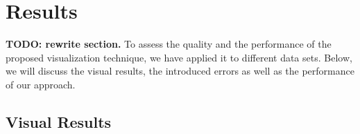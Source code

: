 \documentclass[review,journal]{vgtc}         %
\begin{document}
\section{Results}\label{sec:results}

\textbf{TODO: rewrite section.} To assess the quality and the performance of the proposed visualization technique, we have applied it to different data sets. Below, we will discuss the visual results, the introduced errors as well as the performance of our approach.

\subsection{Visual Results}

\begin{figure}[t]
    \centering
    \\

\end{figure}
\end{document}
